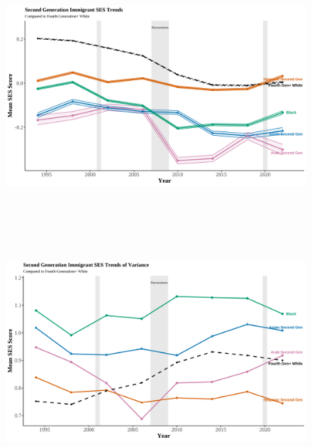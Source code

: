 \clearpage

\begin{center}
    \begin{figure}[H]
    \caption{}
    \includegraphics[width=\textwidth, height=9cm]{figure/05-SES-secondgens.png} 
    \label{fig:diag}
    \caption*{\footnotesize{}}
    \end{figure}
    \hfill%
\end{center}

\clearpage

\begin{center}
    \begin{figure}[H]
    \caption{}
    \includegraphics[width=\textwidth, height=9cm]{figure/09-var-SES-secondgens.png} 
    \label{fig:diag}
    \caption*{\footnotesize{}}
    \end{figure}
    \hfill%
\end{center}


